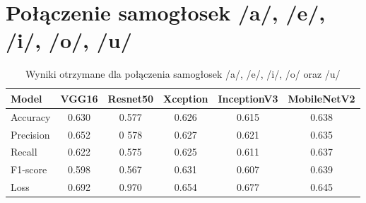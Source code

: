 \section{Połączenie samogłosek /a/, /e/, /i/, /o/, /u/}
\label{sec:samogloski}


\begin{table}[ht]
\centering
\caption{Wyniki otrzymane dla połączenia samogłosek /a/, /e/, /i/, /o/ oraz /u/}
\label{tab:wyniki-vowels}
\begin{tabular}{|l|c|c|c|c|c|}
\hline
\textbf{Model} &\textbf{VGG16} &\textbf{Resnet50} &\textbf{Xception} &\textbf{InceptionV3} &\textbf{MobileNetV2} \\ \hline
    Accuracy &0.630 &0.577 &0.626 &0.615 &0.638 \\ \hline
    Precision &0.652 &0 578 &0.627 &0.621 &0.635 \\ \hline
    Recall &0.622 &0.575 &0.625 &0.611 &0.637 \\ \hline
    F1-score &0.598 &0.567 &0.631 &0.607 &0.639 \\ \hline
    Loss &0.692 &0.970 &0.654 &0.677 &0.645 \\ \hline
\end{tabular}
\end{table}

